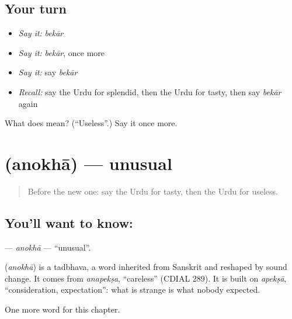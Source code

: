 \subsection*{Your turn}
\begin{itemize}
\raggedright
  \item \emph{Say it:} \emph{bekār}
  \item \emph{Say it:} \emph{bekār}, once more
  \item \emph{Say it:} say \emph{bekār}
  \item \emph{Recall:} say the Urdu for splendid, then the Urdu for tasty, then say \emph{bekār} again
\end{itemize}

\begin{tcolorbox}[breakable,colback=teal!4,colframe=teal!35!black,title={Before you move on}]
What does  mean? (\textquotedblleft{}Useless\textquotedblright{}.) Say it once more.
\end{tcolorbox}
\section[\texorpdfstring{\ur{انوکھا} (anokhā)}{انوکھا (anokhā)}]{ (anokhā) — unusual}

\label{lesson:UR-C222-anokha}



\begin{quote}
Before the new one: say the Urdu for tasty, then the Urdu for useless.
\end{quote}

\subsection*{You'll want to know: }
\textbf{} — \emph{anokhā} — \textquotedblleft{}unusual\textquotedblright{}.

\begin{cousinweb}
\textbf{} (\emph{anokhā}) is a tadbhava, a word inherited from Sanskrit and reshaped by sound change. It comes from \emph{anapekṣa}, \textquotedblleft{}careless\textquotedblright{} (CDIAL 289). It is built on \emph{apekṣā}, \textquotedblleft{}consideration, expectation\textquotedblright{}: what is strange is what nobody expected.
\end{cousinweb}

\begin{grammarlens}[title={What you've built}]
One more word for this chapter.
\end{grammarlens}


